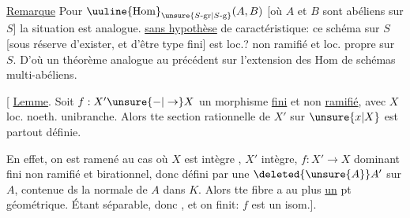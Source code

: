 \uline{Remarque} Pour $\uuline{\mathrm{Hom}}_{\unsure{S\text{-gr}|S\text{-g}}}(A,B)$ [où $A$ et $B$
sont \unsure{]|?}abéliens sur $S$] la situation est analogue.
\uline{sans hypothèse} de  caractéristique:
ce schéma sur $S$ [sous réserve d'exister,
et d'être   type fini] est
loc.? non ramifié et loc. propre sur $S$. D'où
un théorème analogue au précédent sur
l'extension des Hom de schémas multi-abéliens.

[ \uline{Lemme}. Soit $f:X'\unsure{-|\to}X$ un morphisme \uline{fini}
et non \uline{ramifié}, avec $X$  loc. noeth.
unibranche. Alors tte section rationnelle de
$X'$ sur $\unsure{x|X}$ est partout définie.

En effet, on est ramené au cas où
 $X$ est intègre , $X'$ intègre, $f:X'\to X$ dominant
fini non ramifié et birationnel, donc
défini par une  $\deleted{\unsure{A}}A'$ sur $A$,
contenue ds la  normale de $A$ dans $K$.
 Alors tte fibre a au plus \uline{un}
pt géométrique. Étant séparable, 
donc , et on finit: $f$ est un isom.].
